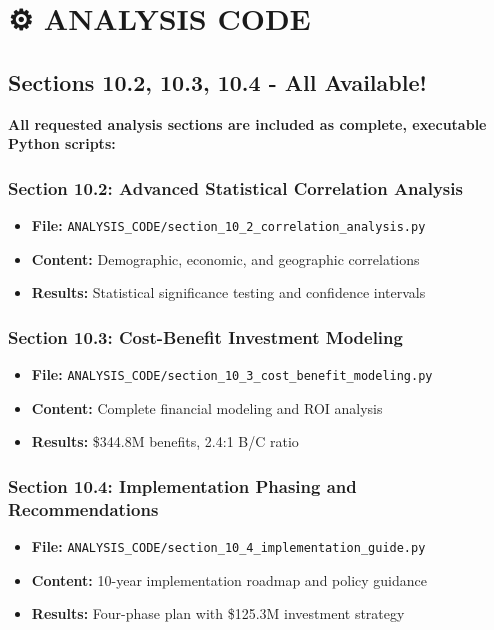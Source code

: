 \documentclass[11pt,letterpaper]{article}
\begin{document}
\section{⚙️ ANALYSIS CODE} \label{analysis-code}

\subsection{Sections 10.2, 10.3, 10.4 - All Available!}
\textbf{All requested analysis sections are included as complete, executable Python scripts:}

\subsubsection{Section 10.2: Advanced Statistical Correlation Analysis}
\begin{itemize}
    \item \textbf{File:} \texttt{ANALYSIS\_CODE/section\_10\_2\_correlation\_analysis.py}
    \item \textbf{Content:} Demographic, economic, and geographic correlations
    \item \textbf{Results:} Statistical significance testing and confidence intervals
\end{itemize}

\subsubsection{Section 10.3: Cost-Benefit Investment Modeling}
\begin{itemize}
    \item \textbf{File:} \texttt{ANALYSIS\_CODE/section\_10\_3\_cost\_benefit\_modeling.py}
    \item \textbf{Content:} Complete financial modeling and ROI analysis
    \item \textbf{Results:} \$344.8M benefits, 2.4:1 B/C ratio
\end{itemize}

\subsubsection{Section 10.4: Implementation Phasing and Recommendations}
\begin{itemize}
    \item \textbf{File:} \texttt{ANALYSIS\_CODE/section\_10\_4\_implementation\_guide.py}
    \item \textbf{Content:} 10-year implementation roadmap and policy guidance
    \item \textbf{Results:} Four-phase plan with \$125.3M investment strategy
\end{itemize}
\end{document}
